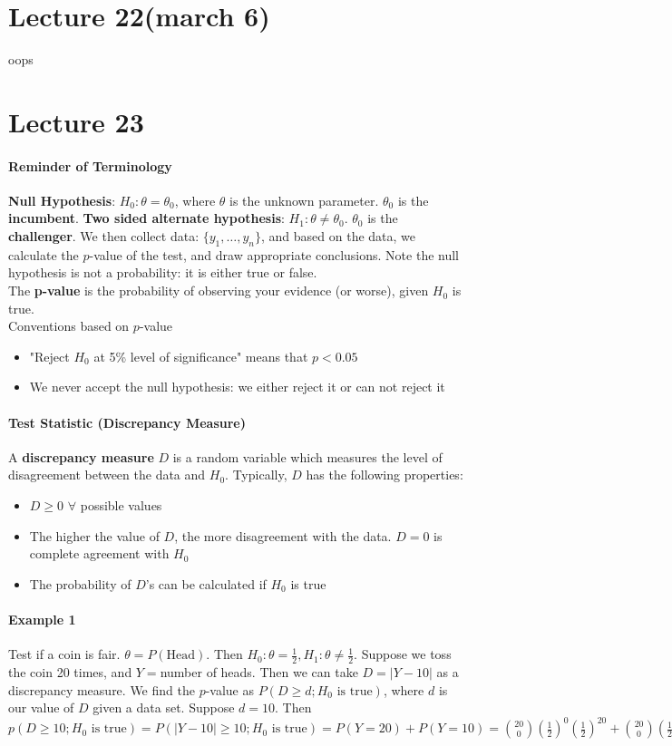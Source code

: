 \documentclass[10pt,letter]{article}
\theoremstyle{plain}
\theoremstyle{definition}
\begin{document}
\section*{Lecture 22(march 6)}
oops 


\section*{Lecture 23}
\paragraph{Reminder of Terminology}
\textbf{Null Hypothesis}: $H_0:\theta=\theta_0$, where $\theta$ is the unknown parameter. $\theta_0$ is the \textbf{incumbent}. \textbf{Two sided alternate hypothesis}: $H_1:\theta\neq\theta_0$. $\theta_0$ is the \textbf{challenger}. We then collect data: $\{y_1,\ldots,y_n\}$, and based on the data, we calculate the $p$-value of the test, and draw appropriate conclusions. Note the null hypothesis is not a probability: it is either true or false. \\ 
The \textbf{p-value} is the probability of observing your evidence (or worse), given $H_0$ is true. \\ 
Conventions based on $p$-value \begin{itemize}
    \item "Reject $H_0$ at 5\% level of significance" means that $p<0.05$ 
    \item We never accept the null hypothesis: we either reject it or can not reject it 
\end{itemize}

\paragraph{Test Statistic (Discrepancy Measure)}
A \textbf{discrepancy measure} $D$ is a random variable which measures the level of disagreement between the data and $H_0$. Typically, $D$ has the following properties: 
\begin{itemize}
    \item $D\geq0$ $\forall$ possible values 
    \item The higher the value of $D$, the more disagreement with the data. $D=0$ is complete agreement with $H_0$ 
    \item The probability of $D$'s can be calculated if $H_0$ is true
\end{itemize}
\paragraph{Example 1}
Test if a coin is fair. $\theta=P(\text{Head})$. Then $H_0:\theta=\frac{1}{2},H_1:\theta\neq\frac{1}{2}$. Suppose we toss the coin 20 times, and $Y=$number of heads. Then we can take $D=|Y-10|$ as a discrepancy measure. We find the $p$-value as $P(D\geq d;H_0\text{ is true})$, where $d$ is our value of $D$ given a data set. Suppose $d=10$. Then $p(D\geq10;H_0\text{ is true})=P(|Y-10|\geq10;H_0\text{ is true})=P(Y=20)+P(Y=10)=\binom{20}{0}\left(\frac{1}{2}\right)^0\left(\frac{1}{2}\right)^{20}+\binom{20}{0}\left(\frac{1}{2}\right)^{20}+\left(\frac{1}{2}\right)^0$ 
\end{document}
